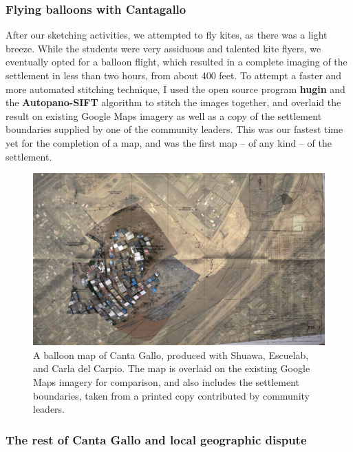 \documentclass[11pt]{report}
\begin{document}
\subsubsection{Flying balloons with Cantagallo}

After our sketching activities, we attempted to fly kites, as there was a light breeze. While the students were very assiduous and talented kite flyers, we eventually opted for a balloon flight, which resulted in a complete imaging of the settlement in less than two hours, from about 400 feet. To attempt a faster and more automated stitching technique, I used the open source program \textbf{hugin} and the \textbf{Autopano-SIFT} algorithm to stitch the images together, and overlaid the result on existing Google Maps imagery as well as a copy of the settlement boundaries supplied by one of the community leaders. This was our fastest time yet for the completion of a map, and was the first map -- of any kind -- of the settlement. 

\begin{figure}[h]
  \begin{center}
	\includegraphics[width=1\textwidth]{images/cantagallo-initial.jpg}
	\caption{A balloon map of Canta Gallo, produced with Shuawa, Escuelab, and Carla del Carpio. The map is overlaid on the existing Google Maps imagery for comparison, and also includes the settlement boundaries, taken from a printed copy contributed by community leaders.}
  \end{center}
\end{figure}

\subsubsection{The rest of Canta Gallo and local geographic dispute}
\end{document}
